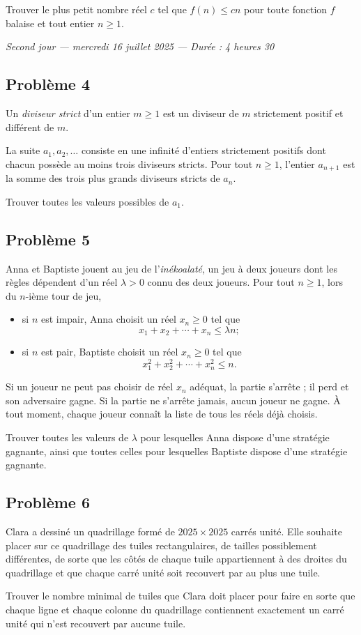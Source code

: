 Trouver le plus petit nombre réel $c$ tel que $f(n) \leqslant cn$ pour
toute fonction $f$ balaise et tout entier $n \geqslant 1$.

\bigskip
\begin{center}
  \emph{Second jour --- mercredi 16 juillet 2025 --- Durée : 4 heures 30}
\end{center}

\subsection*{Problème 4}
Un \emph{diviseur strict} d'un entier $m \geqslant 1$ est un diviseur
de $m$ strictement positif et différent de $m$.

La suite $a_1, a_2, \ldots$ consiste en une infinité d'entiers
strictement positifs dont chacun possède au moins trois diviseurs
stricts. Pour tout $n \geqslant 1$, l'entier $a_{n+1}$ est la somme
des trois plus grands diviseurs stricts de $a_n$.

Trouver toutes les valeurs possibles de $a_1$.

\subsection*{Problème 5}
Anna et Baptiste jouent au jeu de l'\emph{inékoalaté}, un jeu à deux
joueurs dont les règles dépendent d'un réel $\lambda > 0$ connu des
deux joueurs. Pour tout $n \geqslant 1$, lors du $n$-ième tour
de jeu,
\begin{itemize}
  \item si $n$ est impair, Anna choisit un réel $x_n \geqslant 0$ tel
  que
  \[
  x_1 + x_2 + \cdots + x_n \leqslant \lambda n ;
  \]
  \item si $n$ est pair, Baptiste choisit un réel $x_n \geqslant 0$
  tel que
  \[
  x_1^2 + x_2^2 + \cdots + x_n^2 \leqslant n.
  \]
\end{itemize}
Si un joueur ne peut pas choisir de réel $x_n$ adéquat, la partie
s'arrête ; il perd et son adversaire gagne. Si la partie ne s'arrête
jamais, aucun joueur ne gagne. À tout moment, chaque joueur connaît la
liste de tous les réels déjà choisis.

Trouver toutes les valeurs de $\lambda$ pour lesquelles Anna dispose
d'une stratégie gagnante, ainsi que toutes celles pour lesquelles
Baptiste dispose d'une stratégie gagnante.

\subsection*{Problème 6}
Clara a dessiné un quadrillage formé de $2025 \times 2025$ carrés
unité. Elle souhaite placer sur ce quadrillage des tuiles
rectangulaires, de tailles possiblement différentes, de sorte que les
côtés de chaque tuile appartiennent à des droites du quadrillage et
que chaque carré unité soit recouvert par au plus une tuile.

Trouver le nombre minimal de tuiles que Clara doit placer pour faire
en sorte que chaque ligne et chaque colonne du quadrillage contiennent
exactement un carré unité qui n'est recouvert par aucune tuile.
